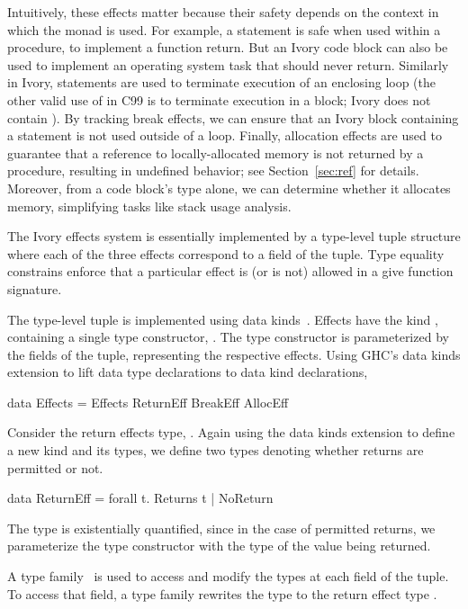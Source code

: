 Intuitively, these effects matter because their safety depends on the context in
which the monad is used. For example, a  statement is safe when used
within a procedure, to implement a function return. But an Ivory code block can
also be used to implement an operating system task that should never
return. Similarly in Ivory,  statements are used to terminate
execution of an enclosing loop (the other valid use of  in C99 is to
terminate execution in a  block; Ivory does not contain
). By tracking break effects, we can ensure that an Ivory block
containing a  statement is not used outside of a loop. Finally,
allocation effects are used to guarantee that a reference to locally-allocated
memory is not returned by a procedure, resulting in undefined behavior; see
Section~\ref{sec:ref} for details. Moreover, from a code block's type alone, we
can determine whether it allocates memory, simplifying tasks like stack usage
analysis.

The Ivory effects system is essentially implemented by a type-level tuple
structure where each of the three effects correspond to a field of the
tuple. Type equality constrains enforce that a particular effect is (or is not)
allowed in a give function signature.

The type-level tuple is implemented using data kinds~\cite{}. Effects have the
kind , containing a single type constructor, . The type
constructor  is parameterized by the fields of the tuple,
representing the respective effects. Using GHC's data kinds extension to lift
data type declarations to data kind declarations,
\begin{code}
data Effects = Effects ReturnEff BreakEff AllocEff
\end{code}

\noindent
Consider the return effects type, .  Again using the data kinds
extension to define a new kind and its types, we define two types denoting
whether returns are permitted or not.

\begin{code}
data ReturnEff = forall t. Returns t | NoReturn
\end{code}

\noindent
The type is existentially quantified, since in the case of permitted returns, we
parameterize the type constructor with the type of the value being returned.

A type family~\cite{} is used to access and modify the types at each field of
the tuple. To access that field, a type family rewrites the  type to
the return effect type .

